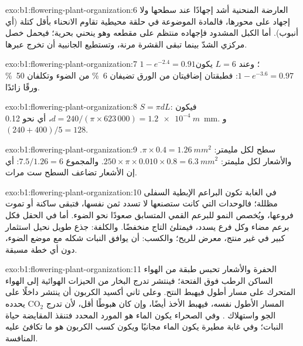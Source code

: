 \begin{solution}{exo:b1:flowering-plant-organization:6}
العارضة المنحنية أشد إجهادًا عند سطحها ولا إجهاد على محورها، فالمادة
الموضوعة في حلقة محيطية تقاوم الانحناء بأقل كتلة (أي أنبوب). أما
الكبل المشدود فإجهاده منتظم على مقطعه وهو ينحني بحرية؛ فيحمل خصل
مركزي الشدّ بينما تبقى القشرة مرنة، وتستطيع  الجانبية أن تخرج
عبرها.
\end{solution}

\begin{solution}{exo:b1:flowering-plant-organization:7}
$1 - e^{-2.4} = 0.91$؛ وعند $L = 6$ يكون $1 - e^{-3.6} = 0.97$:
فطبقتان إضافيتان من الورق تضيفان \qty{6}{\%} من الضوء وتكلفان
\qty{50}{\%} ورقًا زائدًا.
\end{solution}

\begin{solution}{exo:b1:flowering-plant-organization:8}
$S = \pi d L$: فيكون
$d = 240/(\pi\times 623\,000) = \qty{1.2e-4}{m}$، أي نحو
\qty{0.12}{mm}. و$(240 + 400)/5 = 128$.
\end{solution}

\begin{solution}{exo:b1:flowering-plant-organization:9}
سطح  لكل مليمتر: $\pi\times 0.4 = \qty{1.26}{mm^2}$. والأشعار
لكل مليمتر: $250\times\pi\times 0.010\times 0.8 = \qty{6.3}{mm^2}$.
والمجموع $7.5/1.26 = 6$: أي إن الأشعار تضاعف السطح ست مرات.
\end{solution}

\begin{solution}{exo:b1:flowering-plant-organization:10}
في الغابة تكون البراعم الإبطية السفلى مظللة؛ فالوحدات التي كانت
ستصنعها لا تسدد ثمن نفسها، فتبقى ساكنة أو تموت فروعها، ويُخصص النمو
للبرعم القمي المتسابق صعودًا نحو الضوء. أما في الحقل فكل برعم مضاء
وكل فرع يسدد، فيمتلئ التاج منخفضًا. والكلفة: جذع طويل نحيل استثمار
كبير في  غير منتج، معرض للريح؛ والكسب: أن يوافق النبات شكله مع
موضع الضوء، دون أي خطة مسبقة.
\end{solution}

\begin{solution}{exo:b1:flowering-plant-organization:11}
الحفرة والأشعار تحبس طبقة من الهواء الساكن الرطب فوق الفتحة؛ فينتشر
تدرج البخار من الحيزات الهوائية إلى الهواء المتحرك على مسار أطول
فيهبط النتح. وعلى ثاني أكسيد الكربون أن ينتشر داخلًا على المسار
الأطول نفسه، فيهبط الأخذ أيضًا، وإن كان هبوطًا أقل، لأن تدرج
$\mathrm{CO_2}$ يحدده الجو واستهلاك . وفي الصحراء يكون الماء
هو المورد المحدد فتنقذ المقايضة حياة النبات؛ وفي غابة مطيرة يكون
الماء مجانيًا ويكون كسب الكربون هو ما تكافئ عليه المنافسة.
\end{solution}

